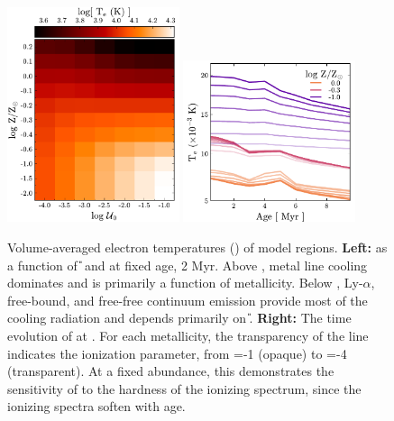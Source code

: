 \begin{figure}
  \begin{centering}
    \includegraphics[width=0.45\textwidth]{manuscript/chapter2/f6a.pdf}
    \includegraphics[width=0.45\textwidth]{manuscript/chapter2/f6b.pdf}
    \caption{Volume-averaged electron temperatures (\Te{}) of model \hii regions. \textbf{Left:} \Te{} as a function of \U{} and \logz{} at fixed age, 2 Myr. Above , metal line cooling dominates and \Te{} is primarily a function of metallicity. Below , Ly-$\alpha$, free-bound, and free-free continuum emission provide most of the cooling radiation and \Te{} depends primarily on \U{}. \textbf{Right:} The time evolution of \Te{} at . For each metallicity, the transparency of the line indicates the ionization parameter, from \logU{}=-1 (opaque) to \logU{}=-4 (transparent). At a fixed abundance, this demonstrates the sensitivity of \Te{} to the hardness of the ionizing spectrum, since the ionizing spectra soften with age.} 
    \label{fig:temp}
  \end{centering}
\end{figure}

